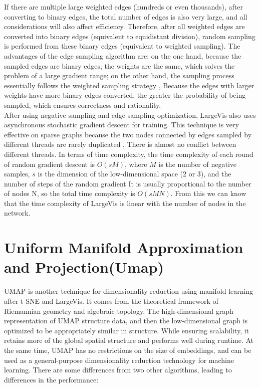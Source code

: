 \noindent If there are multiple large weighted edges (hundreds or even thousands), after converting to binary edges, the total number of edges is also very large, and all considerations will also affect efficiency. Therefore, after all weighted edges are converted into binary edges (equivalent to equidistant division), random sampling is performed from these binary edges (equivalent to weighted sampling). The advantages of the edge sampling algorithm are: on the one hand, because the sampled edges are binary edges, the weights are the same, which solves the problem of a large gradient range; on the other hand, the sampling process essentially follows the weighted sampling strategy , Because the edges with larger weights have more binary edges converted, the greater the probability of being sampled, which ensures correctness and rationality.\\

\noindent After using negative sampling and edge sampling optimization, LargeVis also uses asynchronous stochastic gradient descent for training. This technique is very effective on sparse graphs because the two nodes connected by edges sampled by different threads are rarely duplicated , There is almost no conflict between different threads. In terms of time complexity, the time complexity of each round of random gradient descent is $O(sM)$, where $M$ is the number of negative samples, $s$ is the dimension of the low-dimensional space (2 or 3), and the number of steps of the random gradient It is usually proportional to the number of nodes N, so the total time complexity is $O(sMN)$. From this we can know that the time complexity of LargeVis is linear with the number of nodes in the network.

\chapter{Uniform Manifold Approximation and Projection(Umap)}

UMAP is another technique for dimensionality reduction using manifold learning after t-SNE and LargeVis. It comes from the theoretical framework of Riemannian geometry and algebraic topology. The high-dimensional graph representation of UMAP structure data, and then the low-dimensional graph is optimized to be appropriately similar in structure.  While ensuring scalability, it retains more of the global spatial structure and performs well during runtime. At the same time, UMAP has no restrictions on the size of embeddings, and can be used as a general-purpose dimensionality reduction technology for machine learning. There are some differences from two other algorithms, leading to differences in the performance:\\

